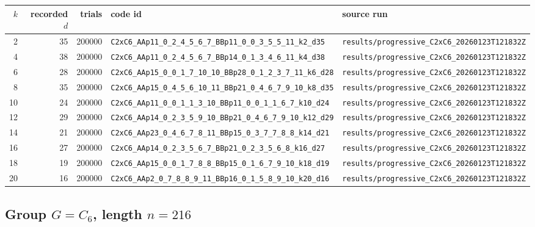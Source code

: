\documentclass[11pt]{article}
\begin{document}
\begin{longtable}{@{}r r r l l@{}}
\toprule
$k$ & recorded $d$ & trials & code id & source run \\
\midrule
\endhead
2 & 35 & 200000 & \texttt{C2xC6\_AAp11\_0\_2\_4\_5\_6\_7\_BBp11\_0\_0\_3\_5\_5\_11\_k2\_d35} & \texttt{results/progressive\_C2xC6\_20260123T121832Z} \\
4 & 38 & 200000 & \texttt{C2xC6\_AAp11\_0\_2\_4\_5\_6\_7\_BBp14\_0\_1\_3\_4\_6\_11\_k4\_d38} & \texttt{results/progressive\_C2xC6\_20260123T121832Z} \\
6 & 28 & 200000 & \texttt{C2xC6\_AAp15\_0\_0\_1\_7\_10\_10\_BBp28\_0\_1\_2\_3\_7\_11\_k6\_d28} & \texttt{results/progressive\_C2xC6\_20260123T121832Z} \\
8 & 35 & 200000 & \texttt{C2xC6\_AAp15\_0\_4\_5\_6\_10\_11\_BBp21\_0\_4\_6\_7\_9\_10\_k8\_d35} & \texttt{results/progressive\_C2xC6\_20260123T121832Z} \\
10 & 24 & 200000 & \texttt{C2xC6\_AAp11\_0\_0\_1\_1\_3\_10\_BBp11\_0\_0\_1\_1\_6\_7\_k10\_d24} & \texttt{results/progressive\_C2xC6\_20260123T121832Z} \\
12 & 29 & 200000 & \texttt{C2xC6\_AAp14\_0\_2\_3\_5\_9\_10\_BBp21\_0\_4\_6\_7\_9\_10\_k12\_d29} & \texttt{results/progressive\_C2xC6\_20260123T121832Z} \\
14 & 21 & 200000 & \texttt{C2xC6\_AAp23\_0\_4\_6\_7\_8\_11\_BBp15\_0\_3\_7\_7\_8\_8\_k14\_d21} & \texttt{results/progressive\_C2xC6\_20260123T121832Z} \\
16 & 27 & 200000 & \texttt{C2xC6\_AAp14\_0\_2\_3\_5\_6\_7\_BBp21\_0\_2\_3\_5\_6\_8\_k16\_d27} & \texttt{results/progressive\_C2xC6\_20260123T121832Z} \\
18 & 19 & 200000 & \texttt{C2xC6\_AAp15\_0\_0\_1\_7\_8\_8\_BBp15\_0\_1\_6\_7\_9\_10\_k18\_d19} & \texttt{results/progressive\_C2xC6\_20260123T121832Z} \\
20 & 16 & 200000 & \texttt{C2xC6\_AAp2\_0\_7\_8\_8\_9\_11\_BBp16\_0\_1\_5\_8\_9\_10\_k20\_d16} & \texttt{results/progressive\_C2xC6\_20260123T121832Z} \\
\bottomrule
\end{longtable}

\subsection{Group $G = C_{6}$, length $n=216$}
\end{document}
